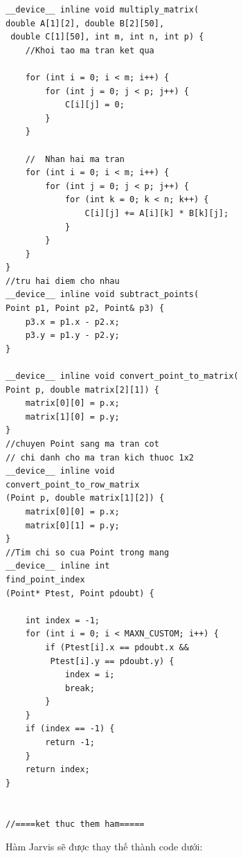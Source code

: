 \documentclass[12pt,a4paper,openany,oneside]{report}
\begin{document}
\begin{lstlisting}
__device__ inline void multiply_matrix(
double A[1][2], double B[2][50],
 double C[1][50], int m, int n, int p) {
	//Khoi tao ma tran ket qua
	
	for (int i = 0; i < m; i++) {
		for (int j = 0; j < p; j++) {
			C[i][j] = 0;
		}
	}
	
	//  Nhan hai ma tran
	for (int i = 0; i < m; i++) {
		for (int j = 0; j < p; j++) {
			for (int k = 0; k < n; k++) {
				C[i][j] += A[i][k] * B[k][j];
			}
		}
	}
}
//tru hai diem cho nhau
__device__ inline void subtract_points(
Point p1, Point p2, Point& p3) {
	p3.x = p1.x - p2.x;
	p3.y = p1.y - p2.y;
}

__device__ inline void convert_point_to_matrix(
Point p, double matrix[2][1]) {
	matrix[0][0] = p.x;
	matrix[1][0] = p.y;
}
//chuyen Point sang ma tran cot
// chi danh cho ma tran kich thuoc 1x2
__device__ inline void 
convert_point_to_row_matrix
(Point p, double matrix[1][2]) {
	matrix[0][0] = p.x;
	matrix[0][1] = p.y;
}
//Tim chi so cua Point trong mang
__device__ inline int 
find_point_index
(Point* Ptest, Point pdoubt) {
	
	int index = -1;
	for (int i = 0; i < MAXN_CUSTOM; i++) {
		if (Ptest[i].x == pdoubt.x &&
		 Ptest[i].y == pdoubt.y) {
			index = i;
			break;
		}
	}
	if (index == -1) {
		return -1;
	}
	return index;
}


//====ket thuc them ham=====
\end{lstlisting}

Hàm Jarvis sẽ được thay thế thành code dưới:
\end{document}
